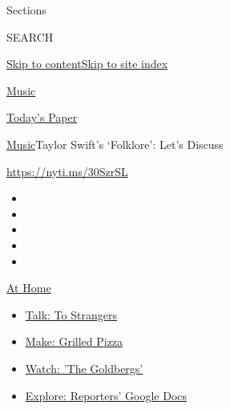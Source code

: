Sections

SEARCH

\protect\hyperlink{site-content}{Skip to
content}\protect\hyperlink{site-index}{Skip to site index}

\href{https://www.nytimes3xbfgragh.onion/section/arts/music}{Music}

\href{https://myaccount.nytimes3xbfgragh.onion/auth/login?response_type=cookie\&client_id=vi}{}

\href{https://www.nytimes3xbfgragh.onion/section/todayspaper}{Today's
Paper}

\href{/section/arts/music}{Music}\textbar{}Taylor Swift's `Folklore':
Let's Discuss

\url{https://nyti.ms/30SzrSL}

\begin{itemize}
\item
\item
\item
\item
\item
\end{itemize}

\href{https://www.nytimes3xbfgragh.onion/spotlight/at-home?action=click\&pgtype=Article\&state=default\&region=TOP_BANNER\&context=at_home_menu}{At
Home}

\begin{itemize}
\tightlist
\item
  \href{https://www.nytimes3xbfgragh.onion/2020/08/03/well/family/the-benefits-of-talking-to-strangers.html?action=click\&pgtype=Article\&state=default\&region=TOP_BANNER\&context=at_home_menu}{Talk:
  To Strangers}
\item
  \href{https://www.nytimes3xbfgragh.onion/2020/08/01/at-home/coronavirus-make-pizza-on-a-grill.html?action=click\&pgtype=Article\&state=default\&region=TOP_BANNER\&context=at_home_menu}{Make:
  Grilled Pizza}
\item
  \href{https://www.nytimes3xbfgragh.onion/2020/07/31/arts/television/goldbergs-abc-stream.html?action=click\&pgtype=Article\&state=default\&region=TOP_BANNER\&context=at_home_menu}{Watch:
  'The Goldbergs'}
\item
  \href{https://www.nytimes3xbfgragh.onion/interactive/2020/at-home/even-more-reporters-editors-diaries-lists-recommendations.html?action=click\&pgtype=Article\&state=default\&region=TOP_BANNER\&context=at_home_menu}{Explore:
  Reporters' Google Docs}
\end{itemize}

